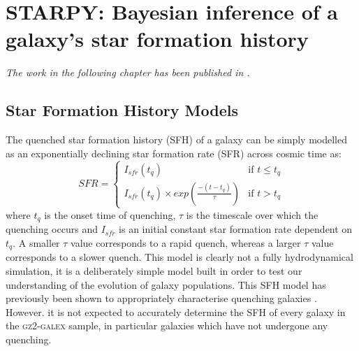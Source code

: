 \chapter{STARPY: Bayesian inference of a galaxy's star formation history}\label{chap:starpy}

\emph{The work in the following chapter has been published in \citet{smethurst15}.}
\\

\section{Star Formation History Models}\label{qmod}

The quenched star formation history (SFH) of a galaxy can be simply modelled as an exponentially declining star formation rate (SFR) across cosmic time as:
\begin{equation}\label{sfh}
SFR =
\begin{cases}
I_{sfr}(t_q) & \text{if } t \leq t_q \\
I_{sfr}(t_q) \times exp{\left( \frac{-(t-t_{q})}{\tau}\right)} & \text{if } t > t_q 
\end{cases}
\end{equation}
where $t_{q}$ is the onset time of quenching, $\tau$ is the timescale over which the quenching occurs and $I_{sfr}$ is an initial constant star formation rate dependent on $t_q$.  A smaller $\tau$ value corresponds to a rapid quench, whereas a larger $\tau$ value corresponds to a slower quench. This model is clearly not a fully hydrodynamical simulation, it is a deliberately simple model built in order to test our understanding of the evolution of galaxy populations. This SFH model has previously been shown to appropriately characterise quenching galaxies \citep{weiner06, Martin07, noeske07,schawinski14}. However. it is not expected to accurately determine the SFH of every galaxy in the \textsc{gz2-galex} sample, in particular galaxies which have not undergone any quenching. 

